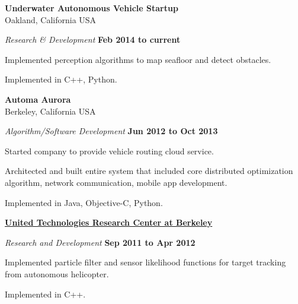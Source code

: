 \textbf{Underwater Autonomous Vehicle Startup}\\
Oakland, California USA
\begin{outerlist}
\item[] \textit{Research \& Development}%
        \hfill \textbf{Feb 2014 to current}
\begin{innerlist}
\item Implemented perception algorithms to map seafloor and detect obstacles.
\item Implemented in C++, Python.
\end{innerlist}
\end{outerlist}

\halfblankline

\textbf{Automa Aurora}\\
Berkeley, California USA
\begin{outerlist}
\item[] \textit{Algorithm/Software Development}%
        \hfill \textbf{Jun 2012 to Oct 2013}
\begin{innerlist}
\item Started company to provide vehicle routing cloud service.
\item Architected and built entire system that included core distributed optimization algorithm, network communication, mobile app development.
\item Implemented in Java, Objective-C, Python.
\end{innerlist}
\end{outerlist}

\halfblankline

\href{http://www.utrc.utc.com/}{\textbf{United Technologies Research Center at Berkeley}}
\begin{outerlist}
\item[] \textit{Research and Development}%
        \hfill \textbf{Sep 2011 to Apr 2012}
\begin{innerlist}
\item Implemented particle filter and sensor likelihood functions for target tracking from autonomous helicopter.
\item Implemented in C++.
\end{innerlist}
\end{outerlist}

\halfblankline

